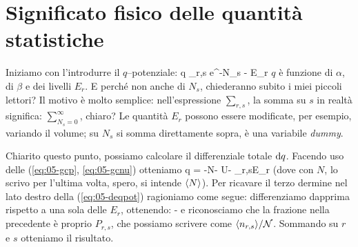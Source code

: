 \section{Significato fisico delle quantità statistiche}
\label{sec:05-significato}

Iniziamo con l'introdurre il $q$--potenziale:
\be
q \equiv \ln\sum_{r,s} e^{-\alpha N_s - \beta E_r}
\ee
$q$ è funzione di $\alpha$, di $\beta$ e dei livelli $E_r$. E perché non anche di $N_s$, chiederanno subito i miei piccoli lettori? Il motivo è molto semplice: nell'espressione $\sum_{r,s}$, la somma su $s$ in realtà significa: $\sum_{N_s=0}^\infty$, chiaro? Le quantità $E_r$ possono essere modificate, per esempio, variando il volume; su $N_s$ si somma direttamente sopra, è una variabile {\em dummy}.

Chiarito questo punto, possiamo calcolare il differenziale totale ${\textrm d}q$. Facendo uso delle (\ref{eq:05-gcp}, \ref{eq:05-gcnu}) otteniamo
\be
\label{eq:05-deqpot}
\de q = -N\de\alpha - U\de\beta - \frac{\beta}{\calN}\sum_{r,s}\aspetta{\nrs}\de E_r
\ee
(dove con $N$, lo scrivo per l'ultima volta, spero, si intende $\langle N\rangle$). 
Per ricavare il terzo dermine nel lato destro della (\ref{eq:05-deqpot}) ragioniamo come segue: differenziamo dapprima rispetto a una sola delle $E_r$, ottenendo:
\be
-\beta {}
\ee
e riconosciamo che la frazione nella precedente è proprio $P_{r,s}$, che possiamo scrivere come $\langle n_{r,s}\rangle/{\mathcal N}$. Sommando su $r$ e $s$ otteniamo il risultato.

